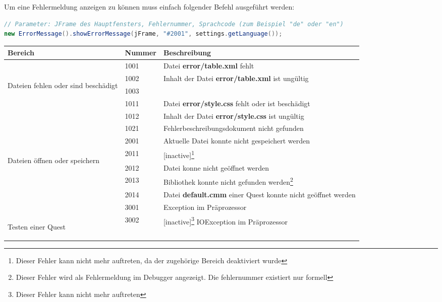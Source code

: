 Um eine Fehlermeldung anzeigen zu können muss einfach folgender Befehl ausgeführt werden:
\begin{lstlisting}[language=JAVA]
// Parameter: JFrame des Hauptfensters, Fehlernummer, Sprachcode (zum Beispiel "de" oder "en")
new ErrorMessage().showErrorMessage(jFrame, "#2001", settings.getLanguage());
\end{lstlisting}

\def\arraystretch{1.6}
\begin{minipage}{14cm}
\begin{tabular}{l|l|l}
	Bereich&Nummer&Beschreibung\\
	\hline
	&1001&Datei \textbf{error/table.xml} fehlt\\
	\multirow{5}{15mm}{\begin{sideways}\parbox{35mm}{Dateien fehlen oder sind beschädigt}\end{sideways}}&1002&\multirow{2}{*}{Inhalt der Datei \textbf{error/table.xml} ist ungültig}\\
	&1003&\\
	&1011&Datei \textbf{error/style.css} fehlt oder ist beschädigt\\
	&1012&Inhalt der Datei \textbf{error/style.css} ist ungültig\\
	&1021&Fehlerbeschreibungsdokument nicht gefunden\\
	\hline
	&2001&Aktuelle Datei konnte nicht gespeichert werden\\
	\multirow{4}{15mm}{\begin{sideways}\parbox{25mm}{Dateien öffnen oder speichern}\end{sideways}}&2011&[inactive]\footnote{Dieser Fehler kann nicht mehr auftreten, da der zugehörige Bereich deaktiviert wurde}\\
	&2012&Datei konne nicht geöffnet werden\\
	&2013&Bibliothek konnte nicht gefunden werden\footnote{Dieser Fehler wird als Fehlermeldung im Debugger angezeigt. Die fehlernummer existiert nur formell}\\%
	&2014&Datei \textbf{default.cmm} einer Quest konnte nicht geöffnet werden\\%
	\hline
	&3001&Exception im Präprozessor\\
	\multirow{4}{15mm}{\begin{sideways}\parbox{25mm}{Testen einer Quest}\end{sideways}}&3002&[inactive]\footnote{Dieser Fehler kann nicht mehr auftreten} IOException im Präprozessor\\

\end{tabular}
\end{minipage}
